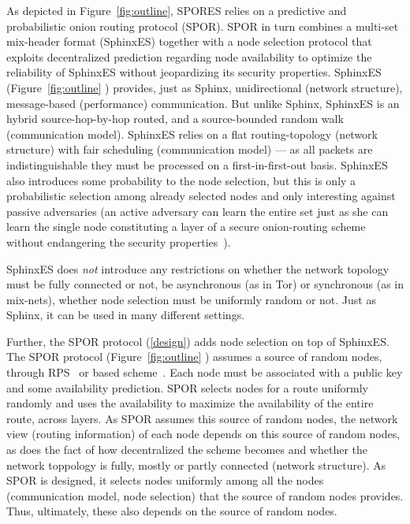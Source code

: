 As depicted in Figure~\ref{fig:outline}, \ac{SPORES} relies on a predictive and probabilistic onion routing protocol (\ac{SPOR}). \ac{SPOR} in turn combines a multi-set mix-header format (SphinxES) together with a node selection protocol that exploits decentralized prediction regarding node availability to optimize the reliability of SphinxES without jeopardizing its security properties.
SphinxES (Figure~\ref{fig:outline} ) provides, just as \ac{Sphinx}, unidirectional (network structure), 
message-based (performance) communication.
But unlike \ac{Sphinx}, SphinxES is an hybrid source-hop-by-hop routed, and a
source-bounded random walk (communication 
model). SphinxES relies on a flat routing-topology (network structure) with fair 
scheduling (communication model) --- as all packets are indistinguishable they 
must be processed on a first-in-first-out basis.
SphinxES also introduces some probability to the node selection, but this is 
only a probabilistic selection among already selected nodes and only 
interesting against passive adversaries (an active adversary can learn the 
entire set just as she can learn the single node constituting a layer of a
secure onion-routing scheme without endangering the security
properties~\cite{CLOnionRouting}).

SphinxES does \emph{not} introduce any restrictions on whether the network 
topology must be fully connected or not, be asynchronous (as in \ac{Tor}) or 
synchronous (as in mix-nets), whether node selection must be uniformly random 
or not.
Just as \ac{Sphinx}, it can be used in many different settings.

Further, the \ac{SPOR} protocol (\cref{design}) adds node selection on top of SphinxES.
The \ac{SPOR} protocol (Figure~\ref{fig:outline} )  assumes a source of random nodes, \eg through 
\ac{RPS}~\cite[\eg][]{BrahmsRPS} or  based 
scheme~\cite[\eg][]{Octopus}.
Each node must be associated with a public key and some availability 
prediction.
\Ac{SPOR} selects nodes for a route uniformly randomly and uses the 
availability to maximize the availability of the entire route, \ie across 
layers.
 As \ac{SPOR} assumes this source of random nodes, the network view (routing 
information) of each node depends on this source of random nodes, as does the 
fact of how decentralized the scheme becomes and whether the network toppology 
is fully, mostly or partly connected (network structure).
As \ac{SPOR} is designed, it selects nodes uniformly among all the nodes 
(communication model, node selection) that the source of random nodes provides.
Thus, ultimately, these also depends on the source of random nodes.

